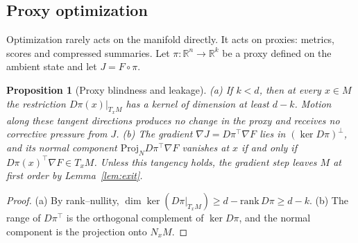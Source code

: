 \documentclass[11pt,a4paper]{article}
\newtheorem{proposition}[theorem]{Proposition}
\theoremstyle{definition}
\theoremstyle{remark}
\newcommand{\R}{\mathbb{R}}
\newcommand{\Proj}{\mathrm{Proj}}
\newcommand{\TM}[1]{T_{#1}M}
\newcommand{\NM}[1]{N_{#1}M}
\begin{document}
\subsection{Proxy optimization}

Optimization rarely acts on the manifold directly. It acts on proxies:
metrics, scores and compressed summaries. Let $\pi:\R^n\to\R^k$ be a proxy
defined on the ambient state and let $J=F\circ\pi$.

\begin{proposition}[Proxy blindness and leakage]\label{prop:proxy}
(a) If $k<d$, then at every $x\in M$ the restriction $D\pi(x)|_{\TM{x}}$ has a
kernel of dimension at least $d-k$. Motion along these tangent directions
produces no change in the proxy and receives no corrective pressure from
$J$. (b) The gradient $\nabla J=D\pi^\top\nabla F$ lies in $(\ker D\pi)^\perp$,
and its normal component $\Proj_N D\pi^\top\nabla F$ vanishes at $x$ if and only if
$D\pi(x)^\top\nabla F\in\TM{x}$. Unless this tangency holds, the gradient step
leaves $M$ at first order by Lemma~\ref{lem:exit}.
\end{proposition}

\begin{proof}
(a) By rank--nullity, $\dim\ker(D\pi|_{\TM{x}})\ge d-\mathrm{rank}\,D\pi\ge d-k$.
(b) The range of $D\pi^\top$ is the orthogonal complement of $\ker D\pi$, and
the normal component is the projection onto $\NM{x}$.
\end{proof}
\end{document}
